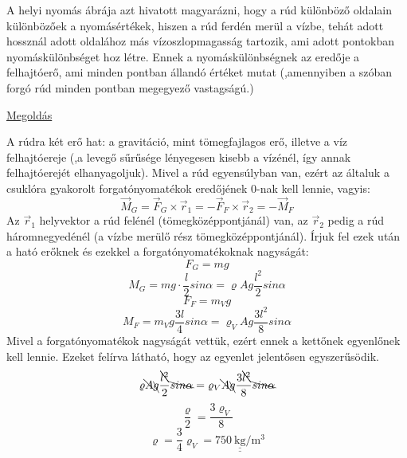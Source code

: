 A helyi nyomás ábrája azt hivatott magyarázni, hogy a rúd különböző oldalain különbözőek a nyomásértékek, hiszen a rúd ferdén merül a vízbe, tehát adott hossznál adott oldalához más vízoszlopmagasság tartozik, ami adott pontokban nyomáskülönbséget hoz létre. Ennek a nyomáskülönbségnek az eredője a felhajtóerő, ami minden pontban állandó értéket mutat (,amennyiben a szóban forgó rúd minden pontban megegyező vastagságú.)
\vspace{0.5cm}

\noindent \underline{Megoldás}

\vspace{0.5cm}
A rúdra két erő hat: a gravitáció, mint tömegfajlagos erő, illetve a víz felhajtóereje (,a levegő sűrűsége lényegesen kisebb a vízénél, így annak felhajtóerejét elhanyagoljuk). Mivel a rúd egyensúlyban van, ezért az általuk a csuklóra gyakorolt forgatónyomatékok eredőjének 0-nak kell lennie, vagyis:
\begin{equation*}
	\vec{M}_G=\vec{F}_G×\vec{r}_1=-\vec{F}_F×\vec{r}_2=-\vec{M}_F
\end{equation*}
Az $\vec{r}_1$ helyvektor a rúd felénél (tömegközéppontjánál) van, az $\vec{r}_2$ pedig a rúd háromnegyedénél \linebreak (a vízbe merülő rész tömegközéppontjánál). Írjuk fel ezek után a ható erőknek és ezekkel a forgatónyomatékoknak nagyságát:
\begin{equation*}
	F_G=mg
\end{equation*}
\begin{equation*}
	M_G=mg\cdot \dfrac{l}{2}sin\alpha=\varrho Ag\dfrac{l^2}{2} sin\alpha
\end{equation*}
\begin{equation*}
	F_F=m_Vg
\end{equation*}
\begin{equation*}
	M_F=m_Vg\dfrac{3l}{4} sin\alpha=\varrho_V Ag \dfrac{3l^2}{8} sin\alpha
\end{equation*}
Mivel a forgatónyomatékok nagyságát vettük, ezért ennek a kettőnek egyenlőnek kell lennie. Ezeket felírva látható, hogy az egyenlet jelentősen egyszerűsödik.
\begin{equation*}
	\varrho \bcancel{A}\bcancel{g}\dfrac{\bcancel{l^2}}{2} \bcancel{sin\alpha}=\varrho_V \bcancel{A}\bcancel{g} \dfrac{3\bcancel{l^2}}{8} \bcancel{sin\alpha}
\end{equation*}
\begin{equation*}
	\dfrac{\varrho}{2}=\dfrac{3\varrho_V}{8}
\end{equation*}
\begin{equation*}
	\varrho=\dfrac{3}{4}\varrho_V=\underline{\underline{\SI{750}{\kilo\gram\per\meter^3}}}
\end{equation*}

\pagebreak